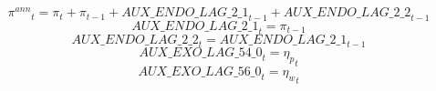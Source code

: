 \begin{dmath}
{{\pi^{ann}}}_{t}={{\pi}}_{t}+{{\pi}}_{t-1}+{AUX\_ENDO\_LAG\_2\_1}_{t-1}+{AUX\_ENDO\_LAG\_2\_2}_{t-1}
\end{dmath}
\begin{dmath}
{AUX\_ENDO\_LAG\_2\_1}_{t}={{\pi}}_{t-1}
\end{dmath}
\begin{dmath}
{AUX\_ENDO\_LAG\_2\_2}_{t}={AUX\_ENDO\_LAG\_2\_1}_{t-1}
\end{dmath}
\begin{dmath}
{AUX\_EXO\_LAG\_54\_0}_{t}={{\eta_p}}_{t}
\end{dmath}
\begin{dmath}
{AUX\_EXO\_LAG\_56\_0}_{t}={{\eta_w}}_{t}
\end{dmath}
